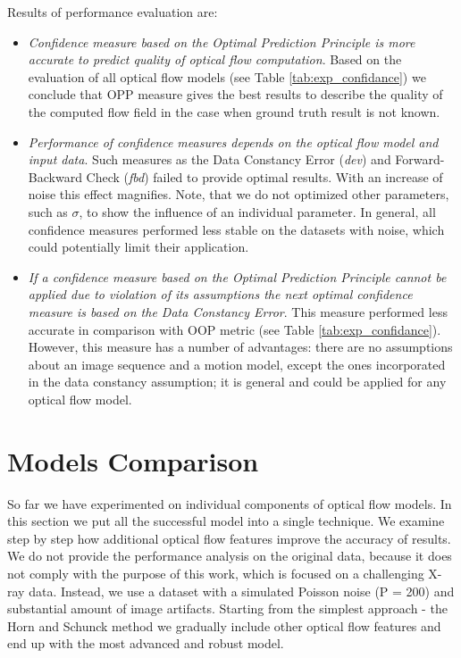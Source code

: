 Results of performance evaluation are:
\begin{itemize}
	\item \textit{Confidence measure based on the Optimal Prediction Principle is more accurate to predict quality of optical flow computation}. Based on the evaluation of all optical flow models (see Table \ref{tab:exp_confidance}) we conclude that OPP measure gives the best results to describe the quality of the computed flow field in the case when ground truth result is not known.
	
	\item \textit{Performance of confidence measures depends on the optical flow model and input data}. Such measures as the Data Constancy Error (\textit{dev}) and Forward-Backward Check (\textit{fbd}) failed to provide optimal results. With an increase of noise this effect magnifies. Note, that we do not optimized other parameters, such as $\sigma$, to show the influence of an individual parameter. In general, all confidence measures performed less stable on the datasets with noise, which could potentially limit their application.   
	
	\item \textit{If a confidence measure based on the Optimal Prediction Principle cannot be applied due to violation of its assumptions the next optimal confidence measure is based on the Data Constancy Error}. This measure performed less accurate in comparison with OOP metric (see Table \ref{tab:exp_confidance}). However, this measure has a number of advantages: there are no assumptions about an image sequence and a motion model, except the ones incorporated in the data constancy assumption;  it is general and could be applied for any optical flow model.
\end{itemize}


\section{Models Comparison}
\label{models_comparison}


So far we have experimented on individual components of optical flow models. In this section we put all the successful model into a single technique.
We examine step by step how additional optical flow features improve the accuracy of results. We do not provide the performance analysis on the original data, because it does not comply with the purpose of this work, which is focused on a challenging X-ray data. Instead, we use a dataset with a simulated Poisson noise (P = 200) and substantial amount of image artifacts.  Starting from the simplest approach - the Horn and Schunck method we gradually include other optical flow features and end up with the most advanced and robust model.



